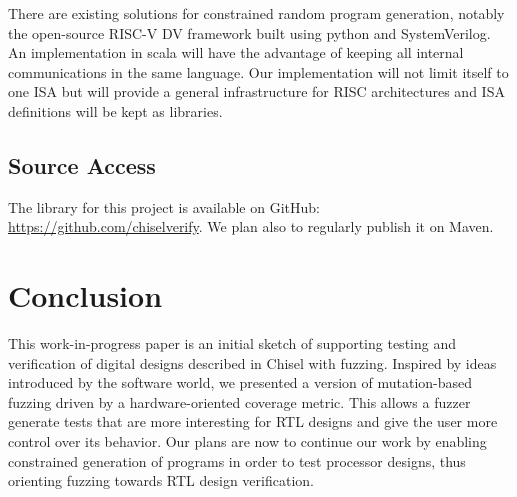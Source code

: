 \documentclass[conference]{IEEEtran}
\newcommand{\todo}[1]{{\color{olive} TODO: #1}}
\newcommand{\martin}[1]{{\color{blue} Martin: #1}}
\begin{document}
There are existing solutions for constrained random program generation, notably the open-source RISC-V DV framework \cite{riscvdv} built using python and SystemVerilog. 
An implementation in scala will have the advantage of keeping all internal communications in the same language. 
Our implementation will not limit itself to one ISA but will provide a general infrastructure for RISC architectures and ISA definitions will be kept as libraries.

\subsection{Source Access}

The library for this project is available on GitHub:\\ \url{https://github.com/chiselverify}.
We plan also to regularly publish it on Maven.
\section{Conclusion}
\label{sec:conclusion}

This work-in-progress paper is an initial sketch of supporting testing and verification
of digital designs described in Chisel with fuzzing. 
Inspired by ideas introduced by the software world, we presented a version of mutation-based fuzzing driven by a hardware-oriented coverage metric.
This allows a fuzzer generate tests that are more interesting for RTL designs and give the user more control over its behavior. 
Our plans are now to continue our work by enabling constrained generation of programs in order to test processor designs, thus orienting fuzzing towards RTL design verification.
%
%



\end{document}
